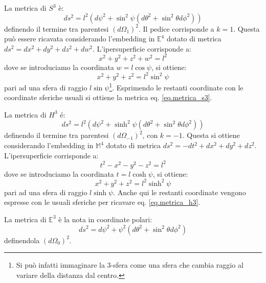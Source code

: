 La metrica di $S^3$ è:
\begin{equation}
    ds^2 = l^2(d\psi^2 +\sin^2\psi( d\theta^2 + \sin^2\theta d\phi^2))
    \label{eq.metrica_s3}
\end{equation}
definendo il termine tra parentesi $(d\Omega_1)^2$. Il pedice corrisponde a $k=1$. Questa può essere ricavata considerando l'embedding in $\mathbb{E}^4$ dotato di metrica $ds^2 = dx^2+ dy^2 + dz^2 + dw^2$. L'ipersuperficie corrisponde a:
\begin{equation*}
    x^2 + y^2 + z^2 + w^2 = l^2
\end{equation*}
dove se introduciamo la coordinata $w = l\cos\psi$, si ottiene:
\begin{equation*}
    x^2 + y^2 + z^2 = l^2\sin^2\psi
\end{equation*}
pari ad una sfera di raggio $l\sin\psi$\footnote{Si può infatti immaginare la 3-sfera come una sfera che cambia raggio al variare della distanza dal centro.}. Esprimendo le restanti coordinate con le coordinate sferiche usuali si ottiene la metrica eq. \ref{eq.metrica_s3}.

La metrica di $H^3$ é:
\begin{equation}
    ds^2 = l^2(d\psi^2 +\sinh^2\psi( d\theta^2 + \sin^2\theta d\phi^2))
    \label{eq.metrica_h3}
\end{equation}
definendo il termine tra parentesi $(d\Omega_{-1})^2$, con $k=-1$. Questa si ottiene considerando l'embedding in $\mathbb{M}^4$ dotato di metrica $ds^2 =-dt^2 + dx^2 +dy^2 +dz^2$. L'ipersuperficie corrisponde a:
\begin{equation*}
    t^2 - x^2 - y^2 -z^2 = l^2
\end{equation*}
dove se introduciamo la coordinata $t = l\cosh\psi$, si ottiene:
\begin{equation*}
    x^2 + y^2 + z^2 = l^2\sinh^2\psi
\end{equation*}
pari ad una sfera di raggio $l\sinh\psi$. Anche qui le restanti coordinate vengono espresse con le usuali sferiche per ricavare eq. \ref{eq.metrica_h3}.

La metrica di $\mathbb{E}^3$ è la nota in coordinate polari:
\begin{equation}
    ds^2 = d\psi^2 + \psi^2(d\theta^2 +\sin^2\theta d\phi^2)
\end{equation}
definendola $(d\Omega_0)^2$. 

